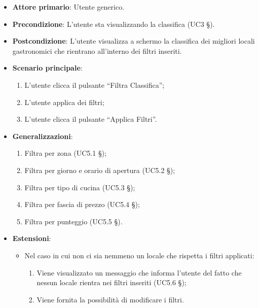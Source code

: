\begin{itemize}
    \item \textbf{Attore primario}: Utente generico.
    \item \textbf{Precondizione}: L’utente sta visualizzando la classifica (UC3 §).
    \item \textbf{Postcondizione}: L’utente visualizza a schermo la classifica dei migliori locali gastronomici che rientrano all’interno dei filtri inseriti.
    \item \textbf{Scenario principale}: 
    \begin{enumerate}
        \item L’utente clicca il pulsante “Filtra Classifica”;
        \item L’utente applica dei filtri;
        \item L’utente clicca il pulsante “Applica Filtri”.
    \end{enumerate}

    \item \textbf{Generalizzazioni}:
    \begin{enumerate}
        \item Filtra per zona (UC5.1 §);
        \item Filtra per giorno e orario di apertura (UC5.2 §);
        \item Filtra per tipo di cucina (UC5.3 §);
        \item Filtra per fascia di prezzo (UC5.4 §);
        \item Filtra per punteggio (UC5.5 §).
    \end{enumerate}

    \item \textbf{Estensioni}:
    \begin{itemize}
        \item Nel caso in cui non ci sia nemmeno un locale che rispetta i filtri applicati:
        \begin{enumerate}
            \item Viene visualizzato un messaggio che informa l’utente del fatto che nessun locale rientra nei filtri inseriti (UC5.6 §);
            \item Viene fornita la possibilità di modificare i filtri.
        \end{enumerate}
    \end{itemize}
\end{itemize}

